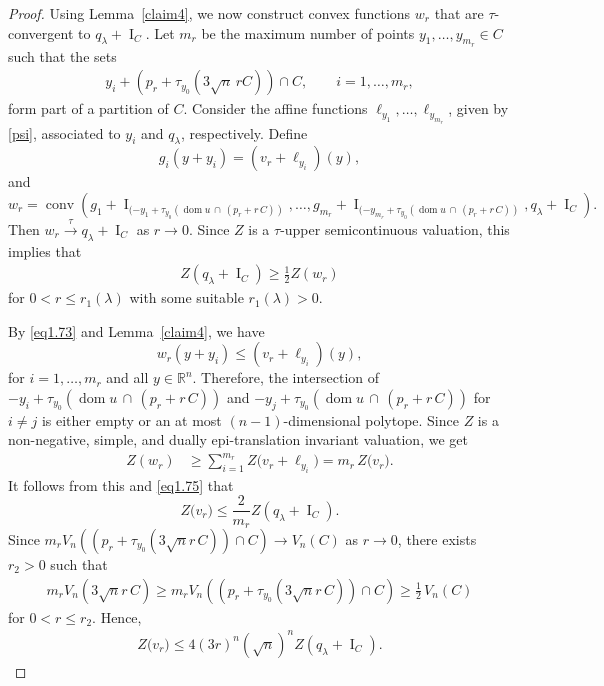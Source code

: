 \documentclass[11pt]{article}
\theoremstyle{definition} %
\DeclareMathOperator{\conv}{conv}
\DeclareMathOperator{\I}{I}
\DeclareMathOperator{\dom}{dom}
\newcommand{\seq}{\xrightarrow{\tau}}
\begin{document}
\begin{proof}
Using Lemma~\ref{claim4}, we now construct convex functions $w_r$ that are
$\tau$-convergent to $q_\lambda+\I_C$. Let $m_r$ be the maximum number of points $y_1, \dots, y_{m_r}\in C$ such that the sets
\begin{align}\label{eq1.73}
y_i+(p_r+\tau_{y_0}(3\sqrt{n}\, rC))\cap C , \qquad i=1,\dots, m_r,    
\end{align}
form part of a partition of $C$. Consider the affine functions $\ell_{y_1}, \dots, \ell_{y_{m_r}}$, given by \eqref{psi}, associated to $y_i$ and $q_{\lambda}$, respectively. Define
$$g_i(y+y_i)=(v_r+\ell_{y_i})(y),$$
and
$$w_r= \conv\left(g_1+\I_{(-y_1+\tau_{y_0}(\dom u\, \cap \, (p_r+r\, C))}, \dots, g_{m_r}+\I_{(-y_{m_r}+\tau_{y_0}(\dom u\, \cap \, (p_r+r\, C))},q_\lambda+\I_{C}\right).$$
Then $w_r\seq q_\lambda+\I_{C}$ as $r\to 0$. Since $Z$ is a $\tau$-upper semicontinuous valuation, this implies that
\begin{align}\label{eq1.75}
  Z( q_\lambda+\I_{C})\geq \frac{1}{2}Z(w_r)  
\end{align}
for $0<r\leq r_1(\lambda)$ with some suitable $r_1(\lambda)>0$. 
\medskip


By \eqref{eq1.73} and  Lemma~\ref{claim4}, we have
$$w_r(y+y_i)\leq (v_r+\ell_{y_i})(y),$$
for $i=1, \dots, m_r$ and all $y\in\mathbb{R}^n$. 
Therefore, the intersection of $-y_i+\tau_{y_0}( \dom u\, \cap \, (p_r+r\, C))$ and $-
y_j+\tau_{y_0}(\dom u\, \cap \, (p_r+r\, C))$ for $i\neq j$ 
is either empty or an at most  $(n-1)$-dimensional polytope.
Since $Z$ is a non-negative, simple, and dually epi-translation invariant valuation, we get
\begin{align*}
 Z(w_r)& \geq \sum_{i=1}^{m_r}Z\bigl(v_r+\ell_{y_i}\bigr)= m_r\, Z\bigl(v_r\bigr). 
\end{align*}
It follows from this and  \eqref{eq1.75} that 
$$Z\bigl(v_r\bigr) \leq \frac{2}{m_r}Z(q_\lambda+ \I_{C}).$$
Since $m_r V_n((p_r+\tau_{y_0}(3\sqrt{n}r\, C))\cap C)\rightarrow V_n(C)$ as $r\rightarrow 0$,  there exists  $r_2>0$ such that
\begin{align}\label{eqr2}
 m_rV_n(3\sqrt{n}r\, C)\geq m_r V_n((p_r+\tau_{y_0}(3\sqrt{n}r\, C))\cap C)\geq \frac{1}{2}\, V_n(C)   
\end{align}
for $0<r\leq r_2$.
Hence,
\begin{align}\label{eq 76}
Z\bigl(v_r\bigr) \leq 4(3r)^n(\sqrt{n})^nZ(q_\lambda+\I_{C}).    
\end{align}




\end{proof}
\end{document}
